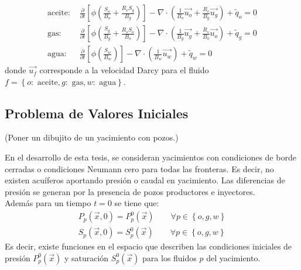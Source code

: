 \begin{align}
\label{aceite}
\text{aceite: }&\frac{\partial}{\partial t} \left[ \phi \left( \frac{S_{o}}{B_{o}} + \frac{R_{v} S_{g}}{B_{g}} \right) \right]
- \nabla \cdot \left( \frac{1}{B_{o}} \vec{u_{o}} + \frac{R_{v}}{B_{g}} \vec{u_{g}} \right) + \tilde{q}_{o}=0  \\
\label{gas}
\text{gas: }&\frac{\partial}{\partial t} \left[ \phi \left( \frac{S_{g}}{B_{g}} + \frac{R_{s} S_{o}}{B_{o}} \right) \right]
- \nabla \cdot \left( \frac{1}{B_{g}} \vec{u_{g}} + \frac{R_{s}}{B_{o}} \vec{u_{o}} \right) + \tilde{q}_{g} = 0 \\
\label{agua}
\text{agua: }&\frac{\partial}{\partial t} \left[\phi \left( \frac{S_{w}}{B_{w}} \right) \right] - \nabla \cdot \left( \frac{1}{B_{w}} \vec{u_{w}} \right) + \tilde{q}_{w} = 0 
\end{align}
donde $\vec{u_{f}}$ corresponde a la velocidad Darcy para el fluido $f = \left\lbrace o:\text{ aceite}, g:\text{ gas}, w:\text{ agua} \right\rbrace $.


\subsection{Problema de Valores Iniciales}

(Poner un dibujito de un yacimiento con pozos.)

En el desarrollo de esta tesis, se consideran yacimientos con condiciones de borde cerradas o condiciones Neumann cero para todas las fronteras. Es decir, no existen acuíferos aportando presión o caudal en yacimiento. Las diferencias de presión se generan por la presencia de pozos productores e inyectores.\\

Además para un tiempo $t=0$ se tiene que:
\begin{align}
	P_{p}(\vec{x},0) = P^{0}_{p}(\vec{x}) \qquad \forall p \in \left\lbrace o,g,w\right\rbrace\\
	S_{p}(\vec{x},0) = S^{0}_{p}(\vec{x}) \qquad \forall p \in \left\lbrace o,g,w\right\rbrace
\end{align}
%
Es decir, existe funciones en el espacio que describen las condiciones iniciales de presión $P^{0}_{p}(\vec{x})$ y saturación $S^{0}_{p}(\vec{x})$ para los fluidos $p$ del yacimiento.

